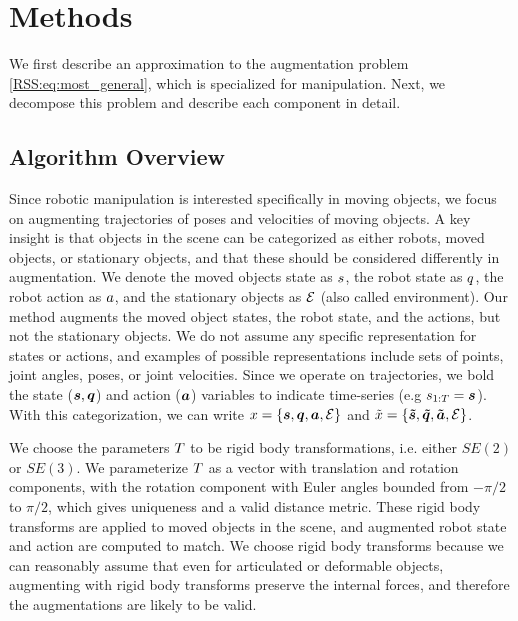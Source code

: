 \section{Methods} \label{RSS:sec:methods}

We first describe an approximation to the augmentation problem \eqref{RSS:eq:most_general}, which is specialized for manipulation. Next, we decompose this problem and describe each component in detail.

\subsection{Algorithm Overview}

Since robotic manipulation is interested specifically in moving objects, we focus on augmenting trajectories of poses and velocities of moving objects. A key insight is that objects in the scene can be categorized as either robots, moved objects, or stationary objects, and that these should be considered differently in augmentation. We denote the moved objects state as $s$, the robot state as $q$, the robot action as $a$, and the stationary objects as $\mathcal{E}$ (also called environment). Our method augments the moved object states, the robot state, and the actions, but not the stationary objects. We do not assume any specific representation for states or actions, and examples of possible representations include sets of points, joint angles, poses, or joint velocities. Since we operate on trajectories, we bold the state ($\bm{s},\bm{q}$) and action ($\bm{a}$) variables to indicate time-series (e.g $s_{1:T}=\bm{s}$). With this categorization, we can write $x=\{\bm{s},\bm{q},\bm{a},\mathcal{E}\}$ and $\Tilde{x}=\{\bm{\Tilde{s}},\bm{\Tilde{q}},\bm{\Tilde{a}},\mathcal{E}\}$.


We choose the parameters $T$ to be rigid body transformations, i.e. either $SE(2)$ or $SE(3)$. We parameterize $T$ as a vector with translation and rotation components, with the rotation component with Euler angles bounded from $-\pi/2$ to $\pi/2$, which gives uniqueness and a valid distance metric. These rigid body transforms are applied to moved objects in the scene, and augmented robot state and action are computed to match. We choose rigid body transforms because we can reasonably assume that even for articulated or deformable objects, augmenting with rigid body transforms preserve the internal forces, and therefore the augmentations are likely to be valid.

